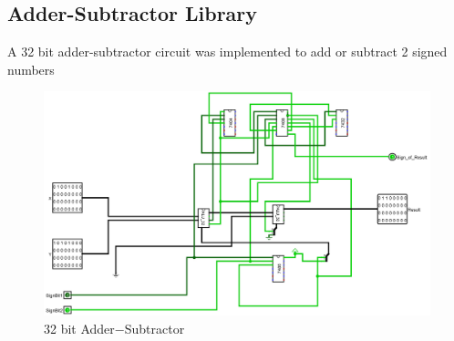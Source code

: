 \documentclass[12pt]{article}
\begin{document}
\subsection{Adder-Subtractor Library}
A 32 bit adder-subtractor circuit was implemented to add or subtract 2 signed numbers
\begin{figure}[H]
    \centering
        \includegraphics[width=\textwidth]{Adder_Subtractor.jpg}
        \caption{32 bit Adder$-$Subtractor}
        \label{fig:32bitaddsub}
\end{figure}

\newpage
\end{document}
